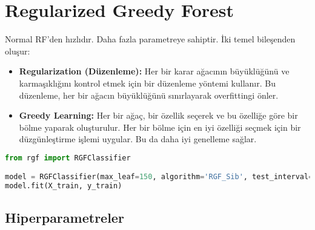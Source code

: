 \section{Regularized Greedy Forest}
Normal RF'den hızlıdır. Daha fazla parametreye sahiptir. İki temel bileşenden oluşur:

\begin{itemize}
    \item \textbf{Regularization (Düzenleme):} Her bir karar ağacının büyüklüğünü ve karmaşıklığını kontrol etmek için bir düzenleme yöntemi kullanır. Bu düzenleme, her bir ağacın büyüklüğünü sınırlayarak overfittingi önler.
    \item \textbf{Greedy Learning:} Her bir ağaç, bir özellik seçerek ve bu özelliğe göre bir bölme yaparak oluşturulur. Her bir bölme için en iyi özelliği seçmek için bir düzgünleştirme işlemi uygular. Bu da daha iyi genelleme sağlar.
\end{itemize}

\begin{lstlisting}[language=Python]
from rgf import RGFClassifier

model = RGFClassifier(max_leaf=150, algorithm='RGF_Sib', test_interval=100)
model.fit(X_train, y_train)
\end{lstlisting}

\subsection{Hiperparametreler}
\begin{table}[h]
\centering
{\scriptsize\renewcommand{\arraystretch}{0.4}
{}}
\end{table}

\newpage